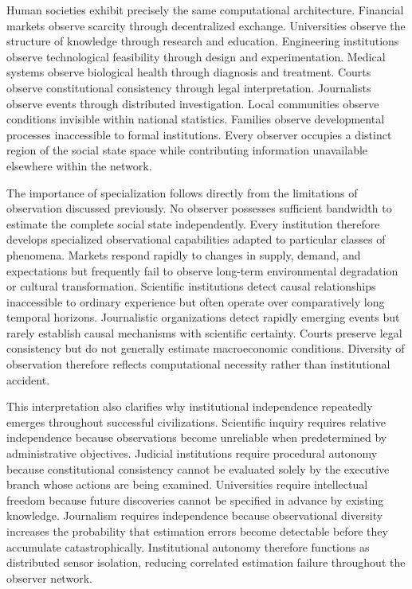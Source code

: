 \documentclass[12pt,a4paper]{article}
\begin{document}
Human societies exhibit precisely the same computational architecture. Financial markets observe scarcity through decentralized exchange. Universities observe the structure of knowledge through research and education. Engineering institutions observe technological feasibility through design and experimentation. Medical systems observe biological health through diagnosis and treatment. Courts observe constitutional consistency through legal interpretation. Journalists observe events through distributed investigation. Local communities observe conditions invisible within national statistics. Families observe developmental processes inaccessible to formal institutions. Every observer occupies a distinct region of the social state space while contributing information unavailable elsewhere within the network.

The importance of specialization follows directly from the limitations of observation discussed previously. No observer possesses sufficient bandwidth to estimate the complete social state independently. Every institution therefore develops specialized observational capabilities adapted to particular classes of phenomena. Markets respond rapidly to changes in supply, demand, and expectations but frequently fail to observe long-term environmental degradation or cultural transformation. Scientific institutions detect causal relationships inaccessible to ordinary experience but often operate over comparatively long temporal horizons. Journalistic organizations detect rapidly emerging events but rarely establish causal mechanisms with scientific certainty. Courts preserve legal consistency but do not generally estimate macroeconomic conditions. Diversity of observation therefore reflects computational necessity rather than institutional accident.

This interpretation also clarifies why institutional independence repeatedly emerges throughout successful civilizations. Scientific inquiry requires relative independence because observations become unreliable when predetermined by administrative objectives. Judicial institutions require procedural autonomy because constitutional consistency cannot be evaluated solely by the executive branch whose actions are being examined. Universities require intellectual freedom because future discoveries cannot be specified in advance by existing knowledge. Journalism requires independence because observational diversity increases the probability that estimation errors become detectable before they accumulate catastrophically. Institutional autonomy therefore functions as distributed sensor isolation, reducing correlated estimation failure throughout the observer network.
\end{document}
